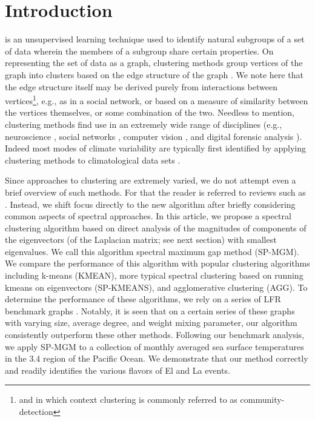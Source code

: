 \documentclass[10pt,journal,compsoc]{IEEEtran} %
\theoremstyle{definition}
\newcommand{\nino}{\text{Ni\~{n}o }}
\newcommand{\nina}{\text{Ni\~{n}a }}
\begin{document}
\section{Introduction}
\label{sec:introduction}
\fi
{} is an unsupervised learning
technique used to identify natural subgroups of a set of data wherein
the members of a subgroup share certain properties.  On representing
the set of data as a graph, clustering methods group vertices of the
graph into clusters based on the edge structure of the graph
\citep[e.g., see][]{schaeffer2007graph}.  We note here that the edge
structure itself may be derived purely from interactions between
vertices\footnote{and in which context clustering is commonly referred
  to as community-detection}, e.g., as in a social network, or based
on a measure of similarity between the vertices themselves, or some
combination of the two. Needless to mention, clustering methods find
use in an extremely wide range of disciplines (e.g., neuroscience
\cite{galbraith2010study}, social networks
\cite{mishra2007clustering}, computer vision \cite{haralick1985image},
and digital forensic analysis \cite{decherchi2009text}).  Indeed most
modes of climate variability are typically first identified by
applying clustering methods to climatological data sets
\citep[e.g.,][and
others]{lund2009revisiting,corte1998regional,unal2003redefining,johnson2013many,
  steinhaeuser2011comparing}.

Since approaches to clustering are extremely varied, we do not attempt
even a brief overview of such methods. For that the reader is referred
to reviews such as \cite{schaeffer2007graph}. Instead, we shift focus
directly to the new algorithm after briefly considering common aspects
of spectral approaches. In this article, we propose a spectral
clustering algorithm based on direct analysis of the magnitudes of
components of the eigenvectors (of the Laplacian matrix; see next
section) with smallest eigenvalues.  We call this algorithm spectral
maximum gap method (SP-MGM).  We compare the performance of this
algorithm with popular clustering algorithms including k-means
(KMEAN), more typical spectral clustering based on running kmeans on
eigenvectors (SP-KMEANS), and agglomerative clustering (AGG).  To
determine the performance of these algorithms, we rely on a series of
LFR benchmark graphs \cite{lancichinetti2008benchmark}.  Notably, it
is seen that on a certain series of these graphs with varying size,
average degree, and weight mixing parameter, our algorithm
consistently outperform these other methods.  Following our benchmark
analysis, we apply SP-MGM to a collection of monthly averaged sea
surface temperatures in the \nino 3.4 region of the Pacific Ocean.  We
demonstrate that our method correctly and readily identifies the
various flavors of El \nino and La \nina events.
\end{document}

